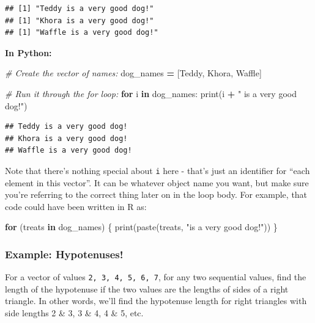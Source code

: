 \documentclass[
]{book}
\newenvironment{Shaded}{\begin{snugshade}}{\end{snugshade}}
\newcommand{\BuiltInTok}[1]{#1}
\newcommand{\CommentTok}[1]{\textcolor[rgb]{0.56,0.35,0.01}{\textit{#1}}}
\newcommand{\ControlFlowTok}[1]{\textcolor[rgb]{0.13,0.29,0.53}{\textbf{#1}}}
\newcommand{\FunctionTok}[1]{\textcolor[rgb]{0.00,0.00,0.00}{#1}}
\newcommand{\KeywordTok}[1]{\textcolor[rgb]{0.13,0.29,0.53}{\textbf{#1}}}
\newcommand{\NormalTok}[1]{#1}
\newcommand{\OperatorTok}[1]{\textcolor[rgb]{0.81,0.36,0.00}{\textbf{#1}}}
\newcommand{\StringTok}[1]{\textcolor[rgb]{0.31,0.60,0.02}{#1}}
\begin{document}
\begin{verbatim}
## [1] "Teddy is a very good dog!"
## [1] "Khora is a very good dog!"
## [1] "Waffle is a very good dog!"
\end{verbatim}

\textbf{In Python:}

\begin{Shaded}
\begin{Highlighting}[]
\CommentTok{\# Create the vector of names:}
\NormalTok{dog\_names }\OperatorTok{=}\NormalTok{ [}\StringTok{\textquotesingle{}Teddy\textquotesingle{}}\NormalTok{, }\StringTok{\textquotesingle{}Khora\textquotesingle{}}\NormalTok{, }\StringTok{\textquotesingle{}Waffle\textquotesingle{}}\NormalTok{]}

\CommentTok{\# Run it through the for loop:}
\ControlFlowTok{for}\NormalTok{ i }\KeywordTok{in}\NormalTok{ dog\_names:}
    \BuiltInTok{print}\NormalTok{(i }\OperatorTok{+} \StringTok{" is a very good dog!"}\NormalTok{)}
\end{Highlighting}
\end{Shaded}

\begin{verbatim}
## Teddy is a very good dog!
## Khora is a very good dog!
## Waffle is a very good dog!
\end{verbatim}

Note that there's nothing special about \texttt{i} here - that's just an identifier for ``each element in this vector''. It can be whatever object name you want, but make sure you're referring to the correct thing later on in the loop body. For example, that code could have been written in R as:

\begin{Shaded}
\begin{Highlighting}[]
\ControlFlowTok{for}\NormalTok{ (treats }\ControlFlowTok{in}\NormalTok{ dog\_names) \{}
  \FunctionTok{print}\NormalTok{(}\FunctionTok{paste}\NormalTok{(treats, }\StringTok{"is a very good dog!"}\NormalTok{))}
\NormalTok{\}}
\end{Highlighting}
\end{Shaded}

\hypertarget{example-hypotenuses}{%
\subsubsection{Example: Hypotenuses!}\label{example-hypotenuses}}

For a vector of values \texttt{2,\ 3,\ 4,\ 5,\ 6,\ 7}, for any two sequential values, find the length of the hypotenuse if the two values are the lengths of sides of a right triangle. In other words, we'll find the hypotenuse length for right triangles with side lengths 2 \& 3, 3 \& 4, 4 \& 5, etc.
\end{document}
